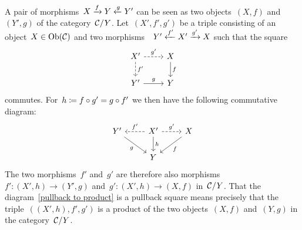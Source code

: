 \begin{remark*}
  A pair of morphisms~$X \xrightarrow{f} Y \xleftarrow{g} Y'$ can be seen as two objects~$(X,f)$ and~$(Y',g)$ of the category~$\mathcal{C}/Y$.
  Let~$(X', f', g')$ be a triple consisting of an object~$X \in \operatorname{Ob}(\mathcal{C})$ and two morphisms~~$Y' \xleftarrow{f'} X' \xrightarrow{g'} X$ such that the square
  \begin{equation}
    \label{pullback to product}
    \begin{tikzcd}
        X'
        \arrow[dashed]{r}[above]{g'}
        \arrow[dashed]{d}[right]{f'}
      & X
        \arrow{d}[right]{f}
      \\
        Y'
        \arrow{r}[above]{g}
      & Y
    \end{tikzcd}
  \end{equation}
  commutes.
  For~$h \coloneqq f \circ g' = g \circ f'$ we then have the following commutative diagram:
  \[
    \begin{tikzcd}
        Y'
        \arrow{dr}[below left]{g}
      & X'
        \arrow[dashed]{l}[above]{f'}
        \arrow{d}[right]{h}
        \arrow[dashed]{r}[above]{g'}
      & X
        \arrow{dl}[below right]{f}
      \\
        {}
      & Y
      & {}
    \end{tikzcd}
  \]
  The two morphisms~$f'$ and~$g'$ are therefore also morphisms~$f' \colon (X',h) \to (Y',g)$ and~$g' \colon (X',h) \to (X,f)$ in~$\mathcal{C}/Y$.
  That the diagram~\eqref{pullback to product} is a pullback square means precisely that the triple~$((X',h), f', g')$ is a product of the two objects~$(X,f)$ and~$(Y,g)$ in the category~$\mathcal{C}/Y$.
\end{remark*}


